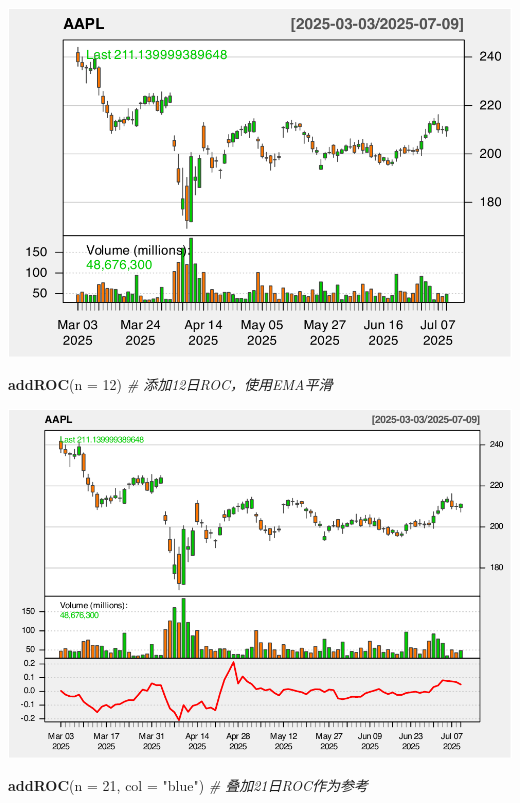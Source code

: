 \documentclass[]{ctexbook}
\newenvironment{Shaded}{\begin{snugshade}}{\end{snugshade}}
\newcommand{\AttributeTok}[1]{\textcolor[rgb]{0.13,0.29,0.53}{#1}}
\newcommand{\CommentTok}[1]{\textcolor[rgb]{0.56,0.35,0.01}{\textit{#1}}}
\newcommand{\DecValTok}[1]{\textcolor[rgb]{0.00,0.00,0.81}{#1}}
\newcommand{\FunctionTok}[1]{\textcolor[rgb]{0.13,0.29,0.53}{\textbf{#1}}}
\newcommand{\NormalTok}[1]{#1}
\newcommand{\StringTok}[1]{\textcolor[rgb]{0.31,0.60,0.02}{#1}}
\begin{document}
\includegraphics[width=0.9\linewidth]{quantmod_files/figure-latex/roc-1}

\begin{Shaded}
\begin{Highlighting}[]
\FunctionTok{addROC}\NormalTok{(}\AttributeTok{n =} \DecValTok{12}\NormalTok{)  }\CommentTok{\# 添加12日ROC，使用EMA平滑  }
\end{Highlighting}
\end{Shaded}

\includegraphics[width=0.9\linewidth]{quantmod_files/figure-latex/roc-2}

\begin{Shaded}
\begin{Highlighting}[]
\FunctionTok{addROC}\NormalTok{(}\AttributeTok{n =} \DecValTok{21}\NormalTok{, }\AttributeTok{col =} \StringTok{"blue"}\NormalTok{)  }\CommentTok{\# 叠加21日ROC作为参考 }
\end{Highlighting}
\end{Shaded}
\end{document}
